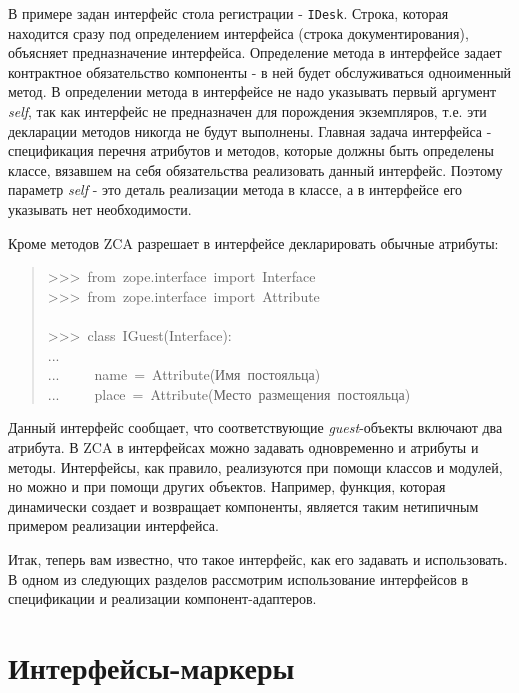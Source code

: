 \documentclass[14pt,a4paper,openany,twoside,final]{extbook}
\providecommand*{\DUroletitlereference}[1]{\textsl{#1}}
\begin{document}
В примере задан интерфейс стола регистрации - \texttt{IDesk}.  Строка,
которая находится сразу под определением интерфейса (строка
документирования), объясняет предназначение интерфейса.  Определение
метода в интерфейсе задает контрактное обязательство компоненты - в
ней будет обслуживаться одноименный метод.  В определении метода в
интерфейсе не надо указывать первый аргумент \DUroletitlereference{self}, так как интерфейс
не предназначен для порождения экземпляров, т.е. эти декларации
методов никогда не будут выполнены.  Главная задача интерфейса -
спецификация перечня атрибутов и методов, которые должны быть
определены классе, вязавшем на себя обязательства реализовать данный
интерфейс.  Поэтому параметр \DUroletitlereference{self} - это деталь реализации метода в
классе, а в интерфейсе его указывать нет необходимости.

Кроме методов ZCA разрешает в интерфейсе декларировать обычные
атрибуты:

\begin{quote}{\ttfamily \raggedright \noindent
>{}>{}>~from~zope.interface~import~Interface\\
>{}>{}>~from~zope.interface~import~Attribute\\
~\\
>{}>{}>~class~IGuest(Interface):\\
...\\
...~~~~~name~=~Attribute(\textquotedbl{}Имя~постояльца\textquotedbl{})\\
...~~~~~place~=~Attribute(\textquotedbl{}Место~размещения~постояльца\textquotedbl{})
}
\end{quote}

Данный интерфейс сообщает, что соответствующие \DUroletitlereference{guest}-объекты
включают два атрибута.  В ZCA в интерфейсах можно задавать
одновременно и атрибуты и методы.  Интерфейсы, как правило,
реализуются при помощи классов и модулей, но можно и при помощи других
объектов.  Например, функция, которая динамически создает и возвращает
компоненты, является таким нетипичным примером реализации интерфейса.

Итак, теперь вам известно, что такое интерфейс, как его задавать и
использовать.  В одном из следующих разделов рассмотрим использование
интерфейсов в спецификации и реализации компонент-адаптеров.


\section{Интерфейсы-маркеры%
  \label{id31}%
}
\end{document}
